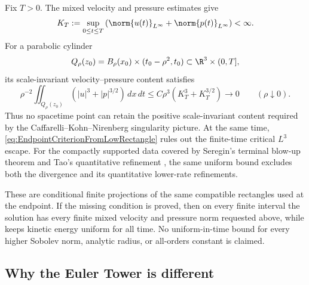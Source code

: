 Fix \(T>0\).
The mixed velocity and pressure estimates give
\begin{equation}\label{eq:FiniteIntervalVelocityPressureSupremum}
  K_T
  :=\sup_{0\leq t\leq T}
  \left(
    \norm{u(t)}_{L^\infty}
    +\norm{p(t)}_{L^\infty}
  \right)
  <\infty.
\end{equation}
For a parabolic cylinder
\[
  Q_\rho(z_0)
  =B_\rho(x_0)\times(t_0-\rho^2,t_0)
  \subset\R^3\times(0,T],
\]
its scale-invariant velocity--pressure content satisfies
\begin{equation}\label{eq:VanishingLocalScaleInvariantContent}
  \rho^{-2}
  \iint_{Q_\rho(z_0)}
  \left(|u|^3+|p|^{3/2}\right)\,dx\,dt
  \leq
  C\rho^3\left(K_T^3+K_T^{3/2}\right)
  \longrightarrow0
  \qquad(\rho\downarrow0).
\end{equation}
Thus no spacetime point can retain the positive scale-invariant content required by the Caffarelli--Kohn--Nirenberg singularity picture.
At the same time, \eqref{eq:EndpointCriterionFromLowRectangle} rules out the finite-time critical \(L^3\) escape.
For the compactly supported data covered by Seregin's terminal blow-up theorem and Tao's quantitative refinement \parencite{Seregin2012,Tao2021Quantitative}, the same uniform bound excludes both the divergence and its quantitative lower-rate refinements.

These are conditional finite projections of the same compatible rectangles used at the
endpoint.  If the missing condition is proved, then on every finite interval the
solution has every finite mixed velocity and pressure norm requested above, while
 keeps kinetic energy uniform for all time.
No uniform-in-time bound for every higher Sobolev norm, analytic radius, or all-orders constant is claimed.

\subsection{Why the Euler Tower is different}\label{sub:WhyTheEulerTowerIsDifferent}


